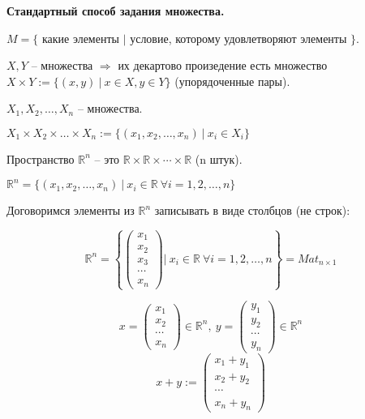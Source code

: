 \vspace{\baselineskip}
\textbf{Стандартный способ задания множества.}

\vspace{\baselineskip}
$M = \{$ какие элементы $|$ условие, которому удовлетворяют элементы $\}$.

\vspace{\baselineskip}
$X, Y$ -- множества $\Rightarrow$ их декартово произедение есть множество $X \times Y := \{ (x, y) \ | \ x \in X, y \in Y\}$ (упорядоченные пары).

$X_1, X_2, \dots, X_n$ -- множества.

$X_1 \times X_2 \times \dots \times X_n := \{(x_1, x_2, \dots, x_n) \ | \ x_i \in X_i\}$

Пространство $\mathbb{R}^n$ -- это $\mathbb{R} \times \mathbb{R} \times \cdots \times \mathbb{R}$ (n штук).

$\mathbb{R}^n = \{ (x_1, x_2, \dots, x_n) \ | \ x_i \in \mathbb{R} \  \forall i = 1, 2, \dots, n \}$

\vspace{\baselineskip}
Договоримся элементы из $\mathbb{R}^n$ записывать в виде столбцов (не строк):

\[ \mathbb{R}^n = \left\{ \begin{pmatrix}
    x_1 \\
    x_2 \\
    x_3 \\
    \cdots \\
    x_n
	\end{pmatrix} | \ x_i \in \mathbb{R} \ \forall i = 1, 2, \dots , n \right\} = Mat_{n \times 1}
\]

\[x = \begin{pmatrix}
x_1 \\
x_2 \\
\cdots \\
x_n
\end{pmatrix} \in \mathbb{R}^n, \ y = \begin{pmatrix}
y_1 \\
y_2 \\
\cdots \\
y_n
\end{pmatrix} \in \mathbb{R}^n \]
\[x+y:= \begin{pmatrix}
x_1 + y_1 \\
x_2 + y_2 \\
\cdots \\
x_n + y_n
\end{pmatrix}
\]

